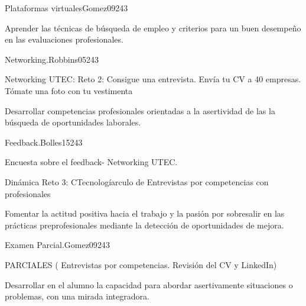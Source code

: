 \begin{syllabus}
\begin{unit}{Plataformas virtuales}{}{Gomez09}{24}{3}
   \begin{learningoutcomes}
      \item Aprender las técnicas de búsqueda de empleo y criterios para un buen desempeño en las evaluaciones profesionales.
   \end{learningoutcomes}
\end{unit}

\begin{unit}{Networking.}{}{Robbins05}{24}{3}
   \begin{topics}
      \item Networking UTEC: Reto 2: Consigue una entrevista. Envía tu CV a 40 empresas. Tómate una foto con tu vestimenta
   \end{topics}

   \begin{learningoutcomes}
      \item Desarrollar competencias profesionales orientadas a la asertividad de las la búsqueda de oportunidades laborales.
   \end{learningoutcomes}
\end{unit}

\begin{unit}{Feedback.}{}{Bolles15}{24}{3}
   \begin{topics}
      \item Encuesta sobre el feedback- Networking UTEC.
      \item Dinámica Reto 3: CTecnologíarculo de Entrevistas por competencias con profesionales
   \end{topics}

   \begin{learningoutcomes}
      \item Fomentar la actitud positiva hacia el trabajo y la pasión por sobresalir en las prácticas preprofesionales mediante la detección de oportunidades de mejora.
   \end{learningoutcomes}
\end{unit}

\begin{unit}{Examen Parcial.}{}{Gomez09}{24}{3}
   \begin{topics}
      \item PARCIALES ( Entrevistas por competencias. Revisión del CV y LinkedIn) 
   \end{topics}

   \begin{learningoutcomes}
      \item Desarrollar en el alumno la capacidad para abordar asertivamente situaciones o problemas, con una mirada integradora.
   \end{learningoutcomes}
\end{unit}


\end{syllabus}

